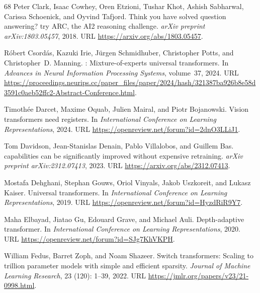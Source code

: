 \documentclass[]{bytedance_seed}
\theoremstyle{definition}
\theoremstyle{remark}
\begin{document}
\begin{thebibliography}{68}
Peter Clark, Isaac Cowhey, Oren Etzioni, Tushar Khot, Ashish Sabharwal, Carissa
  Schoenick, and Oyvind Tafjord.
\newblock Think you have solved question answering? try {ARC}, the {AI2}
  reasoning challenge.
\newblock \emph{arXiv preprint arXiv:1803.05457}, 2018.
\newblock URL \url{https://arxiv.org/abs/1803.05457}.

R{\'o}bert Csord{\'a}s, Kazuki Irie, J{\"u}rgen Schmidhuber, Christopher Potts,
  and Christopher~D. Manning.
: Mixture-of-experts universal transformers.
\newblock In \emph{Advances in Neural Information Processing Systems},
  volume~37, 2024.
\newblock URL
  \url{https://proceedings.neurips.cc/paper_files/paper/2024/hash/321387ba926b8e58d3591c0aeb52ffc2-Abstract-Conference.html}.

Timoth{\'e}e Darcet, Maxime Oquab, Julien Mairal, and Piotr Bojanowski.
\newblock Vision transformers need registers.
\newblock In \emph{International Conference on Learning Representations}, 2024.
\newblock URL \url{https://openreview.net/forum?id=2dnO3LLiJ1}.

Tom Davidson, Jean-Stanislas Denain, Pablo Villalobos, and Guillem Bas.
 capabilities can be significantly improved without expensive
  retraining.
\newblock \emph{arXiv preprint arXiv:2312.07413}, 2023.
\newblock URL \url{https://arxiv.org/abs/2312.07413}.

Mostafa Dehghani, Stephan Gouws, Oriol Vinyals, Jakob Uszkoreit, and Lukasz
  Kaiser.
\newblock Universal transformers.
\newblock In \emph{International Conference on Learning Representations}, 2019.
\newblock URL \url{https://openreview.net/forum?id=HyzdRiR9Y7}.

Maha Elbayad, Jiatao Gu, Edouard Grave, and Michael Auli.
\newblock Depth-adaptive transformer.
\newblock In \emph{International Conference on Learning Representations}, 2020.
\newblock URL \url{https://openreview.net/forum?id=SJg7KhVKPH}.

William Fedus, Barret Zoph, and Noam Shazeer.
\newblock Switch transformers: Scaling to trillion parameter models with simple
  and efficient sparsity.
\newblock \emph{Journal of Machine Learning Research}, 23
  (120): 1--39, 2022.
\newblock URL \url{https://jmlr.org/papers/v23/21-0998.html}.


\end{thebibliography}
\end{document}
